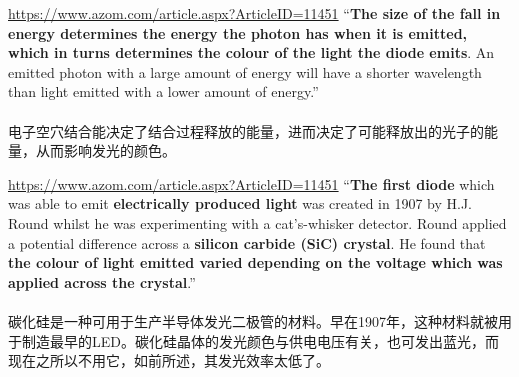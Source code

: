 \begin{slide}{\url{https://www.azom.com/article.aspx?ArticleID=11451}}
  ``\textbf{The size of the fall in energy determines the energy the photon has when it is emitted, which in turns determines the colour of the light the diode emits}. An emitted photon with a large amount of energy will have a shorter wavelength than light emitted with a lower amount of energy.''
  \\~\\
  电子空穴结合能决定了结合过程释放的能量，进而决定了可能释放出的光子的能量，从而影响发光的颜色。
\end{slide}

\begin{slide}{\url{https://www.azom.com/article.aspx?ArticleID=11451}}
  ``\textbf{The first diode} which was able to emit \textbf{electrically produced light} was created in 1907 by H.J. Round whilst he was experimenting with a cat's-whisker detector. Round applied a potential difference across a \textbf{silicon carbide (SiC) crystal}. He found that \textbf{the colour of light emitted varied depending on the voltage which was applied across the crystal}.''
  \\~\\
  碳化硅是一种可用于生产半导体发光二极管的材料。早在1907年，这种材料就被用于制造最早的LED。碳化硅晶体的发光颜色与供电电压有关，也可发出蓝光，而现在之所以不用它，如前所述，其发光效率太低了。
\end{slide}



